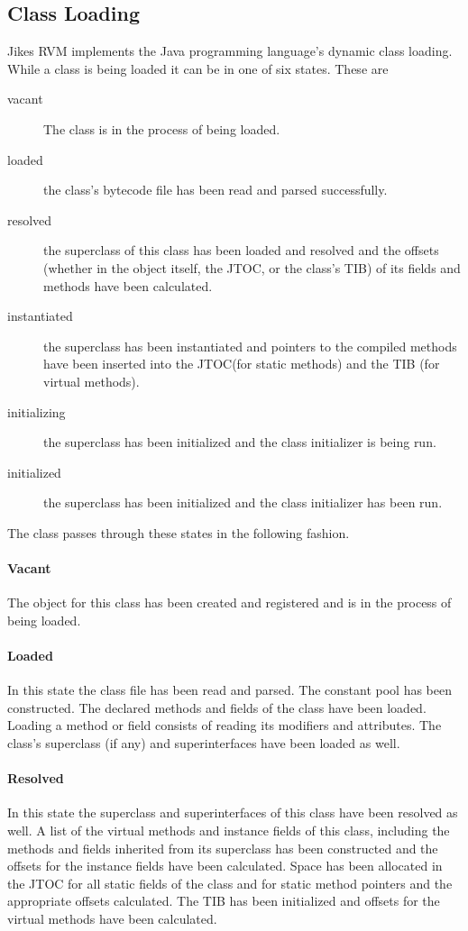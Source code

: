 \subsection{Class Loading} \label{sssec:classLoading}

Jikes\TMweb{} RVM implements the Java\TMweb{} programming
language's dynamic class loading. While a class is being loaded it can
be in one of six states. These are
\begin{description}
\item[vacant] The class is in the process of being loaded.
\item[loaded] the class's bytecode file has been read and parsed successfully.
\item[resolved] the superclass of this class has been loaded and resolved and
the offsets (whether in the object itself, the JTOC, or the class's
TIB) of its fields and methods have been calculated.
\item[instantiated] the superclass has been instantiated and pointers to the
compiled methods have been inserted into the JTOC(for static methods) and the
TIB (for virtual methods).
\item[initializing] the superclass has been initialized and the class
initializer is being run.
\item[initialized] the superclass has been initialized and the class
initializer has been run.
\end{description}

The class passes through these states in the following fashion.

\paragraph{Vacant}
The 
object for this class has been created and registered and is in the
process of being loaded.

\paragraph{Loaded} 
In this state the class file has been read and parsed.  The constant
pool has been constructed. The declared methods and fields of the
class have been loaded.  Loading a method or field consists of reading
its modifiers and attributes. The class's superclass (if any) and
superinterfaces have been loaded as well.

\paragraph{Resolved}
In this state the superclass and superinterfaces of this class have
been resolved as well.  A list of the virtual methods and instance fields
of this class, including the methods and fields inherited from its
superclass has been constructed and the offsets for the instance
fields have been calculated.  Space has been allocated in the JTOC for
all static fields of the class and for static method pointers and the
appropriate offsets calculated.  The TIB has been initialized and
offsets for the virtual methods have been calculated.

